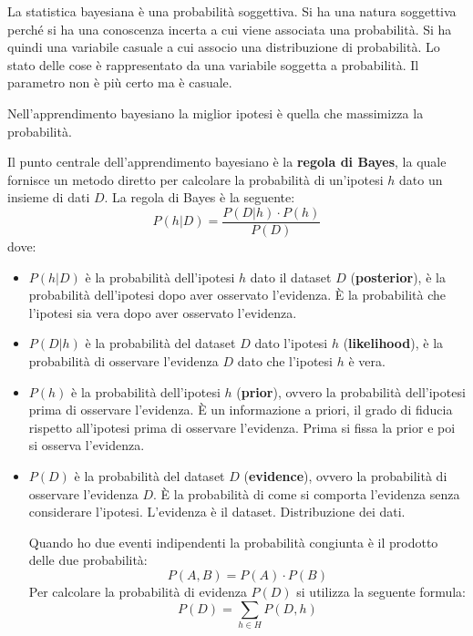 La statistica bayesiana è una probabilità soggettiva. Si ha una natura soggettiva
perché si ha una conoscenza incerta a cui viene associata una probabilità. Si
ha quindi una variabile casuale a cui associo una distribuzione di probabilità.
Lo stato delle cose è rappresentato da una variabile soggetta a probabilità.
Il parametro non è più certo ma è casuale.

Nell'apprendimento bayesiano la miglior ipotesi è quella che massimizza la probabilità.

Il punto centrale dell'apprendimento bayesiano è la \textbf{regola di Bayes},
la quale fornisce un metodo diretto per calcolare la probabilità di un'ipotesi
$h$ dato un insieme di dati $D$. La regola di Bayes è la seguente:
\begin{equation}
    P(h|D) = \frac{P(D|h) \cdot P(h)}{P(D)}
\end{equation}
dove:
\begin{itemize}
    \item $P(h|D)$ è la probabilità dell'ipotesi $h$ dato il dataset $D$
          (\textbf{posterior}), è la probabilità dell'ipotesi dopo aver osservato
          l'evidenza. È la probabilità che l'ipotesi sia vera dopo aver osservato l'evidenza.
    \item $P(D|h)$ è la probabilità del dataset $D$ dato l'ipotesi $h$
          (\textbf{likelihood}), è la probabilità di osservare l'evidenza $D$ dato che
          l'ipotesi $h$ è vera.
    \item $P(h)$ è la probabilità dell'ipotesi $h$ (\textbf{prior}), ovvero la
          probabilità dell'ipotesi prima di osservare l'evidenza. È un informazione
          a priori, il grado di fiducia rispetto all'ipotesi prima di osservare
          l'evidenza. Prima si fissa la prior e poi si osserva l'evidenza.
    \item $P(D)$ è la probabilità del dataset $D$ (\textbf{evidence}), ovvero
          la probabilità di osservare l'evidenza $D$. È la probabilità di come si
          comporta l'evidenza senza considerare l'ipotesi. L'evidenza è il dataset.
          Distribuzione dei dati.

          Quando ho due eventi indipendenti la probabilità congiunta è il prodotto
          delle due probabilità:
          \begin{equation}
              P(A, B) = P(A) \cdot P(B)
          \end{equation}
          Per calcolare la probabilità di evidenza $P(D)$ si utilizza la seguente
          formula:
          \begin{equation}
              P(D) = \sum_{h \in H} P(D, h)
          \end{equation}
\end{itemize}

